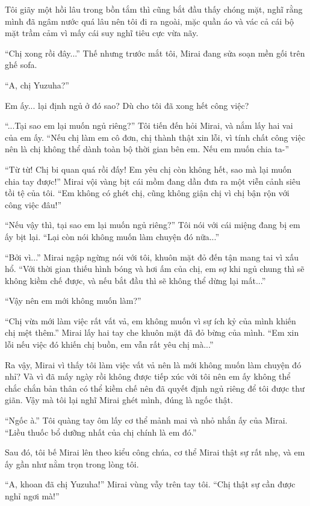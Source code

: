 {Tôi giãy một hồi lâu trong bồn tắm thì cũng bắt đầu thấy chóng mặt, nghĩ
rằng mình đã ngâm nước quá lâu nên tôi đi ra ngoài, mặc quần áo và vác
cả cái bộ mặt trầm cảm vì mấy cái suy nghĩ tiêu cực vừa nãy.

``Chị xong rồi đây...'' Thế nhưng trước mắt tôi, Mirai đang sửa soạn mền
gối trên ghế sofa.

``A, chị Yuzuha?''

Em ấy... lại định ngủ ở đó sao? Dù cho tôi đã xong hết công việc?

``...Tại sao em lại muốn ngủ riêng?'' Tôi tiến đến hỏi Mirai, và nắm lấy
hai vai của em ấy. ``Nếu chị làm em cô đơn, chị thành thật xin lỗi, vì
tính chất công việc nên là chị không thể dành toàn bộ thời gian bên em.
Nếu em muốn chia ta-''

``Từ từ! Chị bi quan quá rồi đấy! Em yêu chị còn không hết, sao mà lại
muốn chia tay được!'' Mirai vội vàng bịt cái mồm đang dần đưa ra một
viễn cảnh siêu tồi tệ của tôi. ``Em không có ghét chị, cũng không giận
chị vì chị bận rộn với công việc đâu!''

``Nếu vậy thì, tại sao em lại muốn ngủ riêng?'' Tôi nói với cái miệng
đang bị em ấy bịt lại. ``Lại còn nói không muốn làm chuyện đó nữa...''

``Bởi vì...'' Mirai ngập ngừng nói với tôi, khuôn mặt đỏ đến tận mang
tai vì xấu hổ. ``Với thời gian thiếu hình bóng và hơi ấm của chị, em sợ
khi ngủ chung thì sẽ không kiềm chế được, và nếu bắt đầu thì sẽ không
thể dừng lại mất...''

``Vậy nên em mới không muốn làm?''

``Chị vừa mới làm việc rất vất vả, em không muốn vì sự ích kỷ của mình
khiến chị mệt thêm.'' Mirai lấy hai tay che khuôn mặt đã đỏ bừng của
mình. ``Em xin lỗi nếu việc đó khiến chị buồn, em vẫn rất yêu chị
mà...''

Ra vậy, Mirai vì thấy tôi làm việc vất vả nên là mới không muốn làm
chuyện đó nhỉ? Và vì đã mấy ngày rồi không được tiếp xúc với tôi nên em
ấy không thể chắc chắn bản thân có thể kiềm chế nên đã quyết định ngủ
riêng để tôi được thư giãn. Vậy mà tôi lại nghĩ Mirai ghét mình, đúng là
ngốc thật.

``Ngốc à.'' Tôi quàng tay ôm lấy cơ thể mảnh mai và nhỏ nhắn ấy của
Mirai. ``Liều thuốc bổ dưỡng nhất của chị chính là em đó.''

Sau đó, tôi bế Mirai lên theo kiểu công chúa, cơ thể Mirai thật sự rất
nhẹ, và em ấy gần như nằm trọn trong lòng tôi.

``A, khoan đã chị Yuzuha!'' Mirai vùng vẫy trên tay tôi. ``Chị thật sự
cần được nghỉ ngơi mà!''

}
